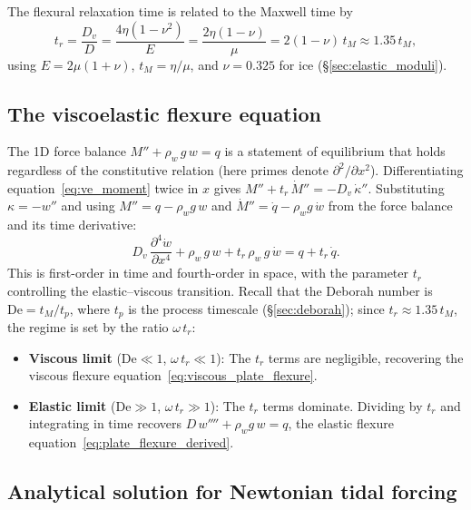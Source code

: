 \documentclass[11pt]{article}
\begin{document}
\medskip
\noindent The flexural relaxation time is related to the Maxwell time by
\begin{equation}
  t_r = \frac{D_v}{D} = \frac{4\eta(1-\nu^2)}{E} = \frac{2\eta(1-\nu)}{\mu} = 2(1-\nu)\,t_M \approx 1.35\,t_M,
  \label{eq:t_relax}
\end{equation}
using $E = 2\mu(1+\nu)$, $t_M = \eta/\mu$, and $\nu = 0.325$ for ice (\S\ref{sec:elastic_moduli}).

\subsection*{The viscoelastic flexure equation}

The 1D force balance $M'' + \rho_w\,g\,w = q$ is a statement of equilibrium that holds regardless of the constitutive relation (here primes denote $\partial^2/\partial x^2$).  Differentiating equation~\eqref{eq:ve_moment} twice in $x$ gives $M'' + t_r\,\dot{M}'' = -D_v\,\dot{\kappa}''$.  Substituting $\kappa = -w''$ and using $M'' = q - \rho_w g\,w$ and $\dot{M}'' = \dot{q} - \rho_w g\,\dot{w}$ from the force balance and its time derivative:
\begin{equation}
  \boxed{D_v\,\frac{\partial^4 \dot{w}}{\partial x^4} + \rho_w\,g\,w + t_r\,\rho_w\,g\,\dot{w} = q + t_r\,\dot{q}.}
  \label{eq:ve_flexure}
\end{equation}
This is first-order in time and fourth-order in space, with the parameter $t_r$ controlling the elastic--viscous transition.  Recall that the Deborah number is $\text{De} = t_M/t_p$, where $t_p$ is the process timescale (\S\ref{sec:deborah}); since $t_r \approx 1.35\,t_M$, the regime is set by the ratio $\omega\,t_r$:
\begin{itemize}
  \item \textbf{Viscous limit} ($\text{De} \ll 1$, $\omega\,t_r \ll 1$): The $t_r$ terms are negligible, recovering the viscous flexure equation~\eqref{eq:viscous_plate_flexure}.
  \item \textbf{Elastic limit} ($\text{De} \gg 1$, $\omega\,t_r \gg 1$): The $t_r$ terms dominate.  Dividing by $t_r$ and integrating in time recovers $D\,w'''' + \rho_w g\,w = q$, the elastic flexure equation~\eqref{eq:plate_flexure_derived}.
\end{itemize}

\subsection*{Analytical solution for Newtonian tidal forcing}
\end{document}
